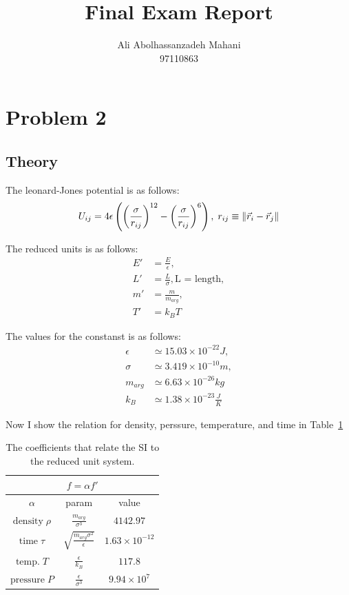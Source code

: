 \documentclass[12pt, a4paper]{article}
\title{Final Exam Report}
\author{Ali Abolhassanzadeh Mahani \\ 97110863}
\date{}
\begin{document}
	\maketitle
	\section{Problem 2}
	\subsection{Theory}
	The leonard-Jones potential is as follows:
		\begin{equation}
		U_{ij} = 4\epsilon \left(\left(\frac{\sigma}{r_{ij}}\right)^{12} - 
		\left(\frac{\sigma}{r_{ij}}\right)^6\right), \; 
		r_{ij} \equiv \norm{\vec{r}_i - \vec{r}_j}
		\label{eq:leonard_jones}
	\end{equation}
	
	The reduced units is as follows:
	\begin{equation}
		\begin{aligned}
			E' &= \frac{E}{\epsilon}, \\
			L' &= \frac{L}{\sigma}, \text{L = length},\\
			 m' &= \frac{m}{m_{arg}}, \\
			T' &= k_B T
		\end{aligned}
	\end{equation}
	
	The values for the constanst is as follows:
	\begin{equation}
		\begin{aligned}
			\epsilon &\simeq 15.03 \times 10^{-22} J,\\
			\sigma &\simeq 3.419 \times 10^{-10} m,\\
			m_{arg} &\simeq 6.63 \times 10^{-26} kg\\
			k_B &\simeq 1.38 \times 10^{-23} \frac{J}{K}
		\end{aligned}
	\end{equation}

	Now I show the relation for density, perssure, temperature, and time in Table~\ref{tab:reduced}
	
	\begin{table}[h!]
		\centering
		\begin{tabular}{|c|c|c|}
	\hline
\multicolumn{3}{|c|}{$f = \alpha f'$}\\
\hline
 $\alpha$ & param & value \\
 \hline
$\text{density} \;\rho$ & $\frac{m_{arg}}{\sigma^3}$ & $4142.97$\\
 \hline
 $\text{time}\; \tau$ & $\sqrt{\frac{m_{arg} \sigma^2}{\epsilon}}$ & $1.63 \times 10^{-12}$ \\
 \hline
$\text{temp.} \; T$ & $\frac{\epsilon}{k_B}$ & $117.8$\\
 \hline
 $\text{pressure}\; P$ & $\frac{\epsilon}{\sigma^3}$ & $9.94 \times 10^{7}$ \\	
 \hline
		\end{tabular}
	\caption{The coefficients that relate the SI to the reduced unit system. }
	\label{tab:reduced}
	\end{table}
	
\end{document}
